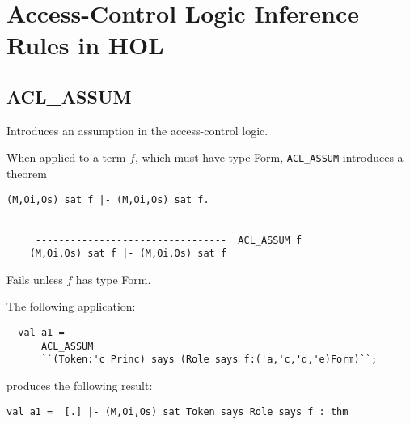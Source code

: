 
\chapter{Access-Control Logic Inference Rules in HOL}
\label{cha:access-control-logic}

\section{ACL\_ASSUM}
\label{sec:acl-assum}





\egroup

\SYNOPSIS
Introduces an assumption in the access-control logic.

\DESCRIBE
When applied to a term $f$, which must have type Form,
\texttt{ACL\_ASSUM} introduces a theorem 
\begin{verbatim}
(M,Oi,Os) sat f |- (M,Oi,Os) sat f.


     ---------------------------------  ACL_ASSUM f
    (M,Oi,Os) sat f |- (M,Oi,Os) sat f
\end{verbatim}

\FAILURE
Fails unless $f$ has type Form.

\EXAMPLE
The following application:
\begin{holboxed}
\begin{verbatim}
- val a1 = 
      ACL_ASSUM 
      ``(Token:'c Princ) says (Role says f:('a,'c,'d,'e)Form)``;
\end{verbatim}
\end{holboxed}
produces the following result:
\begin{holboxed}
\begin{verbatim}
val a1 =  [.] |- (M,Oi,Os) sat Token says Role says f : thm
\end{verbatim}
\end{holboxed}

